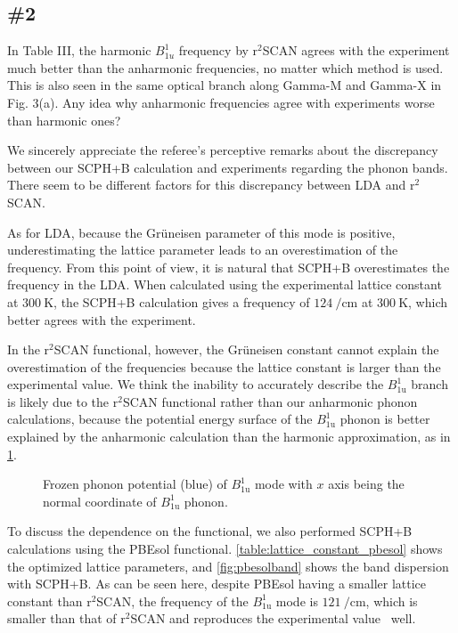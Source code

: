 \documentclass[luatex,onecolumn,showpacs,aps,preprint,prb,amsfonts,amsmath,amssymb,floatfix,groupedaddress, longbibliography]{revtex4-2}
\begin{document}
\subsection{\#2}

\RC In Table III, the harmonic $B_{1u}^{1}$ frequency by $\mathrm{r}^2$SCAN agrees with the experiment much better than the anharmonic frequencies, no matter which method is used. This is also seen in the same optical branch along Gamma-M and Gamma-X in Fig. 3(a). Any idea why anharmonic frequencies agree with experiments worse than harmonic ones?

\AR  We sincerely appreciate the referee’s perceptive remarks about the discrepancy between our SCPH+B calculation and experiments regarding the phonon bands. There seem to be different factors for this discrepancy between LDA and $\mathrm{r}^2$SCAN. 

 As for LDA, because the Gr\"{u}neisen parameter of this mode is positive, underestimating the lattice parameter leads to an overestimation of the frequency. From this point of view, it is natural that SCPH+B overestimates the frequency in the LDA. When calculated using the experimental lattice constant at $\SI{300}{\kelvin}$, the SCPH+B calculation gives a frequency of $\SI{124}{\per\cm}$ at $\SI{300}{\kelvin}$, which better agrees with the experiment. 

In the $\mathrm{r}^2$SCAN functional, however, the Gr\"{u}neisen constant cannot explain the overestimation of the frequencies because the lattice constant is larger than the experimental value. We think the inability to accurately describe the $B_{\mathrm{1u}}^{1}$ branch is likely due to the $\mathrm{r}^2$SCAN functional rather than our anharmonic phonon calculations, because the potential energy surface of the $B_{\mathrm{1u}}^{1}$ phonon is better explained by the anharmonic calculation than the harmonic approximation, as in \cref{fig:b1u}.

\begin{figure}[htb]
\centering
\caption{Frozen phonon potential (blue) of $B^1_{\mathrm{1u}}$ mode with $x$ axis being the normal coordinate of $B^1_{\mathrm{1u}}$ phonon.}
\label{fig:b1u}
\end{figure}

To discuss the dependence on the functional, we also performed SCPH+B calculations using the PBEsol functional. \cref{table:lattice_constant_pbesol} shows the optimized lattice parameters, and \cref{fig:pbesolband} shows the band dispersion with SCPH+B. As can be seen here, despite PBEsol having a smaller lattice constant than $\mathrm{r}^2$SCAN, the frequency of the $B_{\mathrm{1u}}^{1}$ mode is $\SI{121}{\per\cm}$, which is smaller than that of $\mathrm{r}^2$SCAN and reproduces the experimental value~\cite{traylor1971Lattice} well.
\end{document}
